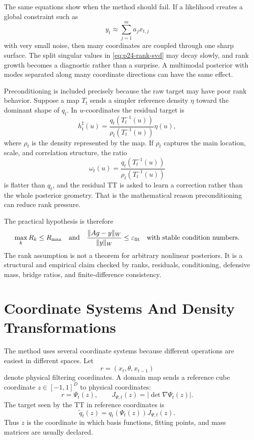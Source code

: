 \documentclass[11pt]{article}
\begin{document}
The same equations show when the method should fail.  If a likelihood creates
a global constraint such as
\[
    y_t\approx \sum_{j=1}^m a_j x_{t,j}
    \label{eq:p24-rank-global-constraint}
\]
with very small noise, then many coordinates are coupled through one sharp
surface.  The split singular values in \eqref{eq:p24-rank-svd} may decay
slowly, and rank growth becomes a diagnostic rather than a surprise.  A
multimodal posterior with modes separated along many coordinate directions can
have the same effect.

Preconditioning is included precisely because the raw target may have poor
rank behavior.  Suppose a map \(T_t\) sends a simpler reference density
\(\eta\) toward the dominant shape of \(q_t\).  In \(u\)-coordinates the
residual target is
\[
    h^\sharp_t(u)
    =
    \frac{q_t(T_t^{-1}(u))}
         {\rho_t(T_t^{-1}(u))}
    \eta(u),
    \label{eq:p24-rank-residual}
\]
where \(\rho_t\) is the density represented by the map.  If \(\rho_t\) captures
the main location, scale, and correlation structure, the ratio
\[
    \omega_t(u)
    =
    \frac{q_t(T_t^{-1}(u))}
         {\rho_t(T_t^{-1}(u))}
    \label{eq:p24-rank-residual-ratio}
\]
is flatter than \(q_t\), and the residual TT is asked to learn a correction
rather than the whole posterior geometry.  That is the mathematical reason
preconditioning can reduce rank pressure.

The practical hypothesis is therefore
\[
    \max_k R_k \le R_{\max}
    \quad\text{and}\quad
    \frac{\|A g-y\|_{W}}{\|y\|_{W}}\le\varepsilon_{\rm fit}
    \quad\text{with stable condition numbers}.
    \label{eq:p24-rank-diagnostic}
\]
The rank assumption is not a theorem for arbitrary nonlinear posteriors.  It
is a structural and empirical claim checked by ranks, residuals, conditioning,
defensive mass, bridge ratios, and finite-difference consistency.

\section{Coordinate Systems And Density Transformations}

The method uses several coordinate systems because different operations are
easiest in different spaces.  Let
\[
    r=(x_t,\theta,x_{t-1})
    \label{eq:p24-coord-physical}
\]
denote physical filtering coordinates.  A domain map sends a reference cube
coordinate \(z\in[-1,1]^D\) to physical coordinates:
\[
    r=\Psi_t(z),
    \qquad
    J_{\Psi,t}(z)=\left|\det\nabla\Psi_t(z)\right|.
    \label{eq:p24-coord-domain}
\]
The target seen by the TT in reference coordinates is
\[
    \widetilde q_t(z)
    =
    q_t(\Psi_t(z))J_{\Psi,t}(z).
    \label{eq:p24-coord-reference-density}
\]
Thus \(z\) is the coordinate in which basis functions, fitting points, and
mass matrices are usually declared.
\end{document}
